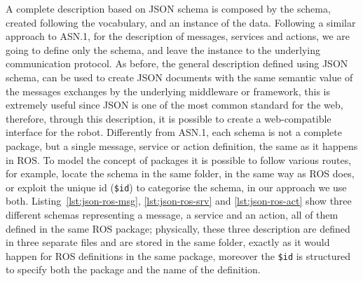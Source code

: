 A complete description based on JSON schema is composed by the schema, created following the vocabulary, and an instance of the data. Following a similar approach to ASN.1, for the description of messages, services and actions, we are going to define only the schema, and leave the instance to the underlying communication protocol. As before, the general description defined using JSON schema, can be used to create JSON documents with the same semantic value of the messages exchanges by the underlying middleware or framework, this is extremely useful since JSON is one of the most common standard for the web, therefore, through this description, it is possible to create a web-compatible interface for the robot. Differently from ASN.1, each schema is not a complete package, but a single message, service or action definition, the same as it happens in ROS. To model the concept of packages it is possible to follow various routes, for example, locate the schema in the same folder, in the same way as ROS does, or exploit the unique id (\texttt{\$id}) to categorise the schema, in our approach we use both. Listing~\ref{lst:json-ros-msg}, \ref{lst:json-ros-srv} and \ref{lst:json-ros-act} show three different schemas representing a message, a service and an action, all of them defined in the same ROS package; physically, these three description are defined in three separate files and are stored in the same folder, exactly as it would happen for ROS definitions in the same package, moreover the \texttt{\$id} is structured to specify both the package and the name of the definition.

